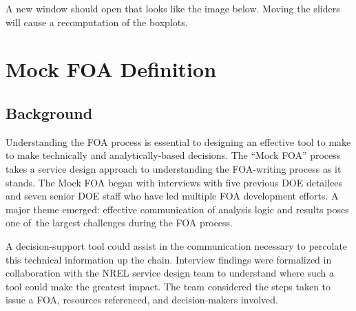 \documentclass[letterpaper,10pt,english]{sphinxmanual}
\begin{document}
\begin{sphinxVerbatim}[commandchars=\\\{\}]
  
\end{sphinxVerbatim}

A new window should open that looks like the image below. Moving the
sliders will cause a recomputation of the boxplots.

\begin{sphinxVerbatim}[commandchars=\\\{\}]
\end{sphinxVerbatim}

\noindent{}


\chapter{Mock FOA Definition}
\label{\detokenize{doc-src/mock-foa:mock-foa-definition}}\label{\detokenize{doc-src/mock-foa::doc}}

\section{Background}
\label{\detokenize{doc-src/mock-foa:background}}
Understanding the FOA process is essential to designing an effective
tool to make to make technically and analytically-based decisions. The
“Mock FOA” process takes a service design approach to understanding the
FOA-writing process as it stands. The Mock FOA began with interviews
with five previous DOE detailees and seven senior DOE staff who have led
multiple FOA development efforts. A major theme emerged: effective
communication of analysis logic and results poses one of the largest
challenges during the FOA process.

A decision-support tool could assist in the communication necessary to
percolate this technical information up the chain. Interview findings
were formalized in collaboration with the NREL service design team to
understand where such a tool could make the greatest impact. The team
considered the steps taken to issue a FOA, resources referenced, and
decision-makers involved.
\end{document}
